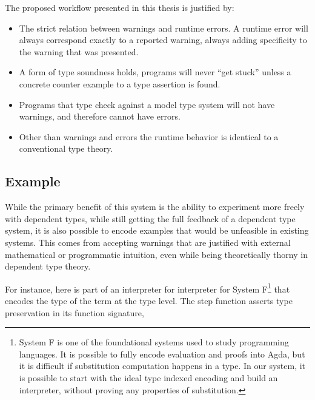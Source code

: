 The proposed workflow presented in this thesis is justified by:
\begin{itemize}
\item The strict relation between warnings and runtime errors.
A runtime error will always correspond exactly to a reported warning, always adding specificity to the warning that was presented.
\item A form of type soundness holds, programs will never ``get stuck'' unless a concrete counter example to a type assertion is found.
\item Programs that type check against a model type system will not have warnings, and therefore cannot have errors.
\item Other than warnings and errors the runtime behavior is identical to a conventional type theory.
\end{itemize}

\subsection{Example}

While the primary benefit of this system is the ability to experiment more freely with dependent types, while still getting the full feedback of a dependent type system, it is also possible to encode examples that would be unfeasible in existing systems.
This comes from accepting warnings that are justified with external mathematical or programmatic intuition, even while being theoretically thorny in dependent type theory.

For instance, here is part of an interpreter for interpreter for System F\footnote{
 System F is one of the foundational systems used to study programming languages.
 It is possible to fully encode evaluation and proofs into Agda, but it is difficult if substitution computation happens in a type.
 In our system, it is possible to start with the ideal type indexed encoding and build an interpreter, without proving any properties of substitution.
} that encodes the type of the term at the type level. The step function asserts type preservation in its function signature,

